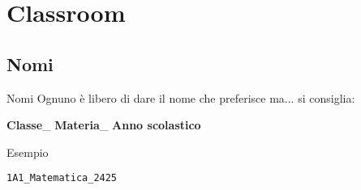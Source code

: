 \section{Classroom}
\subsection{Nomi}
\begin{frame}{Nomi}
	Ognuno è libero di dare il nome che preferisce ma... si consiglia:
	
	\textbf{Classe}\_ \textbf{Materia}\_ \textbf{Anno scolastico}
	
	Esempio
	
	\texttt{1A1\_Matematica\_2425}
\end{frame}